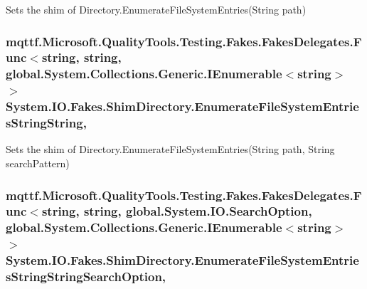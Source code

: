 Sets the shim of Directory.\-Enumerate\-File\-System\-Entries(\-String path)

\hypertarget{class_system_1_1_i_o_1_1_fakes_1_1_shim_directory_a0c67f3e251abfa55a0c6ca2e461080e0}{
\subsubsection[{Enumerate\-File\-System\-Entries\-String\-String}]{\setlength{\rightskip}{0pt plus 5cm}mqttf.\-Microsoft.\-Quality\-Tools.\-Testing.\-Fakes.\-Fakes\-Delegates.\-Func$<$string, string, global.\-System.\-Collections.\-Generic.\-I\-Enumerable$<$string$>$ $>$ System.\-I\-O.\-Fakes.\-Shim\-Directory.\-Enumerate\-File\-System\-Entries\-String\-String\hspace{0.3cm}{\ttfamily [static]}, {\ttfamily [set]}}}\label{class_system_1_1_i_o_1_1_fakes_1_1_shim_directory_a0c67f3e251abfa55a0c6ca2e461080e0}


Sets the shim of Directory.\-Enumerate\-File\-System\-Entries(\-String path, String search\-Pattern)

\hypertarget{class_system_1_1_i_o_1_1_fakes_1_1_shim_directory_aff236dcd06967693f8168a42b900804f}{
\subsubsection[{Enumerate\-File\-System\-Entries\-String\-String\-Search\-Option}]{\setlength{\rightskip}{0pt plus 5cm}mqttf.\-Microsoft.\-Quality\-Tools.\-Testing.\-Fakes.\-Fakes\-Delegates.\-Func$<$string, string, global.\-System.\-I\-O.\-Search\-Option, global.\-System.\-Collections.\-Generic.\-I\-Enumerable$<$string$>$ $>$ System.\-I\-O.\-Fakes.\-Shim\-Directory.\-Enumerate\-File\-System\-Entries\-String\-String\-Search\-Option\hspace{0.3cm}{\ttfamily [static]}, {\ttfamily [set]}}}\label{class_system_1_1_i_o_1_1_fakes_1_1_shim_directory_aff236dcd06967693f8168a42b900804f}


